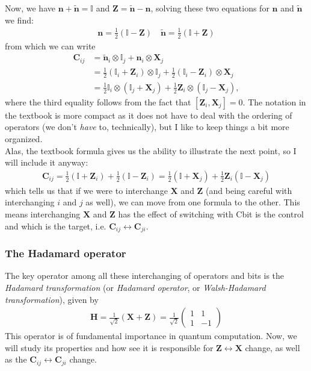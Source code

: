 \documentclass{book}
\theoremstyle{definition}
\newcommand{\nn}{\nonumber}
\newcommand{\n}{\mathbf{n}}
\newcommand{\X}{\mathbf{X}}
\newcommand{\f}[2]{\frac{#1}{#2}}
\newcommand{\lp}{\left(}
\newcommand{\rp}{\right)}
\newcommand{\Z}{\mathbf{Z}}
\newcommand{\had}{\mathbf{H}}
\begin{document}
Now, we have $\n + \tilde{\n} = \mathbb{I}$ and $\Z = \tilde{\n} - \n$, solving these two equations for $\n$ and $\tilde{\n}$ we find:
\begin{align}\label{n}
\boxed{\n = \f{1}{2}\lp \mathbb{I} - \Z \rp \quad \tilde{\n} = \f{1}{2}\lp \mathbb{I} + \Z \rp}
\end{align}
from which we can write
\begin{align}
\mathbf{C}_{ij} &=  \tilde{\n}_i\otimes \mathbb{I}_j + \n_i \otimes \X_j \nn\\
&= \f{1}{2}(\mathbb{I}_i + \Z_i)\otimes \mathbb{I}_j + \f{1}{2}(\mathbb{I}_i - \Z_i)\otimes \X_j \nn\\
&= \f{1}{2}\mathbb{I}_i\otimes (\mathbb{I}_j + \X_j) + \f{1}{2} \Z_i\otimes(\mathbb{I}_j - \X_j),
\end{align}
where the third equality follows from the fact that $[\Z_i, \X_j] = 0$. The notation in the textbook is more compact as it does not have to deal with the ordering of operators (we don't \textit{have} to, technically), but I like to keep things a bit more organized. \\

Alas, the textbook formula gives us the ability to illustrate the next point, so I will include it anyway:
\begin{align}
\boxed{\mathbf{C}_{ij} = \f{1}{2}(\mathbb{I} + \Z_i) + \f{1}{2}(\mathbb{I} - \Z_i) = \f{1}{2}(\mathbb{I} + \X_j) + \f{1}{2}\Z_i (\mathbb{I} - \X_j)}
\end{align}
which tells us that if we were to interchange $\X$ and $\Z$ (and being careful with interchanging $i$ and $j$ as well), we can move from one formula to the other. This means interchanging $\X$ and $\Z$ has the effect of switching with Cbit is the control and which is the target, i.e. $\mathbf{C}_{ij} \leftrightarrow \mathbf{C}_{ji}$. 

\subsubsection{The Hadamard operator}

The key operator among all these interchanging of operators and bits is the \textit{Hadamard transformation} (or \textit{Hadamard operator}, or \textit{Walsh-Hadamard transformation}), given by
\begin{align}
\boxed{\had = \f{1}{\sqrt{2}} (\X + \Z) = \f{1}{\sqrt{2}}\begin{pmatrix}
1 & 1 \\ 1 & -1
\end{pmatrix}}
\end{align}
This operator is of fundamental importance in quantum computation. Now, we will study its properties and how see it is responsible for $\Z \leftrightarrow \X$ change, as well as the $\mathbf{C}_{ij} \leftrightarrow \mathbf{C}_{ji}$ change. \\
\end{document}
